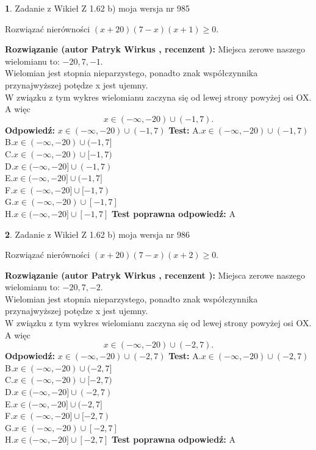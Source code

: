 \documentclass[12pt, a4paper]{article}
\theoremstyle{definition} %
\newtheorem{zad}{}
\newcommand{\zadStart}[1]{\begin{zad}#1\newline}
\newcommand{\zadStop}{\end{zad}}
\newcommand{\rozwStart}[2]{\noindent \textbf{Rozwiązanie (autor #1 , recenzent #2): }\newline}
\newcommand{\rozwStop}{\newline}
\newcommand{\odpStart}{\noindent \textbf{Odpowiedź:}\newline}
\newcommand{\odpStop}{\newline}
\newcommand{\testStart}{\noindent \textbf{Test:}\newline}
\newcommand{\testStop}{\newline}
\newcommand{\kluczStart}{\noindent \textbf{Test poprawna odpowiedź:}\newline}
\newcommand{\kluczStop}{\newline}
\begin{document}
\zadStart{Zadanie z Wikieł Z 1.62 b) moja wersja nr 985}

Rozwiązać nierówności $(x+20)(7-x)(x+1)\ge0$.
\zadStop
\rozwStart{Patryk Wirkus}{}
Miejsca zerowe naszego wielomianu to: $-20, 7, -1$.\\
Wielomian jest stopnia nieparzystego, ponadto znak współczynnika przy\linebreak najwyższej potędze x jest ujemny.\\ W związku z tym wykres wielomianu zaczyna się od lewej strony powyżej osi OX. A więc $$x \in (-\infty,-20) \cup (-1,7).$$
\rozwStop
\odpStart
$x \in (-\infty,-20) \cup (-1,7)$
\odpStop
\testStart
A.$x \in (-\infty,-20) \cup (-1,7)$\\
B.$x \in (-\infty,-20) \cup (-1,7]$\\
C.$x \in (-\infty,-20) \cup [-1,7)$\\
D.$x \in (-\infty,-20] \cup (-1,7)$\\
E.$x \in (-\infty,-20] \cup (-1,7]$\\
F.$x \in (-\infty,-20] \cup [-1,7)$\\
G.$x \in (-\infty,-20) \cup [-1,7]$\\
H.$x \in (-\infty,-20] \cup [-1,7]$
\testStop
\kluczStart
A
\kluczStop



\zadStart{Zadanie z Wikieł Z 1.62 b) moja wersja nr 986}

Rozwiązać nierówności $(x+20)(7-x)(x+2)\ge0$.
\zadStop
\rozwStart{Patryk Wirkus}{}
Miejsca zerowe naszego wielomianu to: $-20, 7, -2$.\\
Wielomian jest stopnia nieparzystego, ponadto znak współczynnika przy\linebreak najwyższej potędze x jest ujemny.\\ W związku z tym wykres wielomianu zaczyna się od lewej strony powyżej osi OX. A więc $$x \in (-\infty,-20) \cup (-2,7).$$
\rozwStop
\odpStart
$x \in (-\infty,-20) \cup (-2,7)$
\odpStop
\testStart
A.$x \in (-\infty,-20) \cup (-2,7)$\\
B.$x \in (-\infty,-20) \cup (-2,7]$\\
C.$x \in (-\infty,-20) \cup [-2,7)$\\
D.$x \in (-\infty,-20] \cup (-2,7)$\\
E.$x \in (-\infty,-20] \cup (-2,7]$\\
F.$x \in (-\infty,-20] \cup [-2,7)$\\
G.$x \in (-\infty,-20) \cup [-2,7]$\\
H.$x \in (-\infty,-20] \cup [-2,7]$
\testStop
\kluczStart
A
\kluczStop
\end{document}
